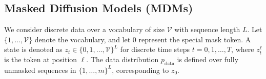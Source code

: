 

\subsection{Masked Diffusion Models (MDMs)}
We consider discrete data over a vocabulary of size $\mathcal{V}$ with sequence length $L$. Let $\{1,\ldots,\mathcal{V}\}$ denote the vocabulary, and let $0$ represent the special mask token. A state is denoted as $z_t \in \{0,1,\ldots,\mathcal{V}\}^L$ for discrete time steps $t = 0,1,\ldots,T$, where $z_t^\ell$ is the token at position $\ell$. The data distribution $p_{\text{data}}$ is defined over fully unmasked sequences in $\{1,\ldots,m\}^L$, corresponding to $z_0$.

